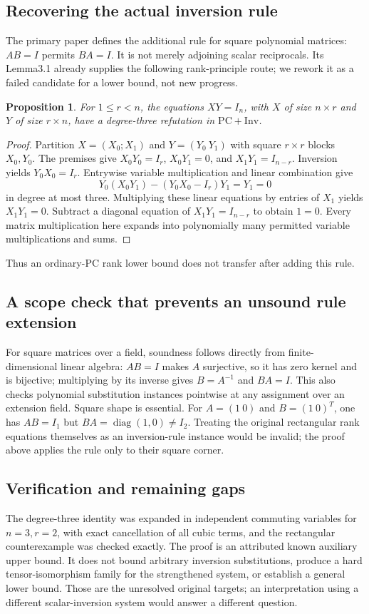 \documentclass[11pt]{article}
\newtheorem{proposition}{Proposition}
\begin{document}
\subsection{Recovering the actual inversion rule}
The primary paper defines the additional rule for square polynomial matrices: $AB=I$ permits $BA=I$. It is not merely adjoining scalar reciprocals. Its Lemma3.1 already supplies the following rank-principle route; we rework it as a failed candidate for a lower bound, not new progress.
\begin{proposition}
For $1\le r<n$, the equations $XY=I_n$, with $X$ of size $n\times r$ and $Y$ of size $r\times n$, have a degree-three refutation in $\mathrm{PC}+\mathrm{Inv}$.
\end{proposition}
\begin{proof}
Partition $X=(X_0;X_1)$ and $Y=(Y_0\ Y_1)$ with square $r\times r$ blocks $X_0,Y_0$. The premises give $X_0Y_0=I_r$, $X_0Y_1=0$, and $X_1Y_1=I_{n-r}$. Inversion yields $Y_0X_0=I_r$. Entrywise variable multiplication and linear combination give
\[
Y_0(X_0Y_1)-(Y_0X_0-I_r)Y_1=Y_1=0
\]
in degree at most three. Multiplying these linear equations by entries of $X_1$ yields $X_1Y_1=0$. Subtract a diagonal equation of $X_1Y_1=I_{n-r}$ to obtain $1=0$. Every matrix multiplication here expands into polynomially many permitted variable multiplications and sums.
\end{proof}
Thus an ordinary-PC rank lower bound does not transfer after adding this rule.
\subsection{A scope check that prevents an unsound rule extension}
For square matrices over a field, soundness follows directly from finite-dimensional linear algebra: $AB=I$ makes $A$ surjective, so it has zero kernel and is bijective; multiplying by its inverse gives $B=A^{-1}$ and $BA=I$. This also checks polynomial substitution instances pointwise at any assignment over an extension field. Square shape is essential. For $A=(1\ 0)$ and $B=(1\ 0)^T$, one has $AB=I_1$ but $BA=\operatorname{diag}(1,0)\ne I_2$. Treating the original rectangular rank equations themselves as an inversion-rule instance would be invalid; the proof above applies the rule only to their square corner.
\subsection{Verification and remaining gaps}
The degree-three identity was expanded in independent commuting variables for $n=3,r=2$, with exact cancellation of all cubic terms, and the rectangular counterexample was checked exactly. The proof is an attributed known auxiliary upper bound. It does not bound arbitrary inversion substitutions, produce a hard tensor-isomorphism family for the strengthened system, or establish a general lower bound. Those are the unresolved original targets; an interpretation using a different scalar-inversion system would answer a different question.
\end{document}
